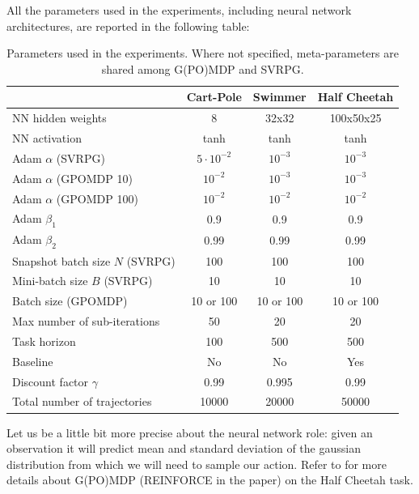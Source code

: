 All the parameters used in the experiments, including neural network architectures, are reported in the following table:

\begin{table}[H]\caption{Parameters used in the experiments. Where not specified, meta-parameters are shared among G(PO)MDP and SVRPG.}\label{table:metaparams}
	\centering
	\begin{tabular}{| l | c  c  c |}
		\hline	
		& Cart-Pole & Swimmer & Half Cheetah \\
		\hline
		NN hidden weights & 8 & 32x32 & 100x50x25 \\
		NN activation & tanh & tanh & tanh \\
		Adam $\alpha$ (SVRPG) & $5\cdotp10^{-2}$ & $10^{-3}$ & $10^{-3}$ \\
		Adam $\alpha$ (GPOMDP 10) & $10^{-2}$ & $10^{-3}$ & $10^{-3}$ \\
		Adam $\alpha$ (GPOMDP 100) & $10^{-2}$ & $10^{-2}$ & $10^{-2}$ \\
		Adam $\beta_1$ & 0.9 & 0.9 & 0.9 \\
		Adam $\beta_2$ & 0.99 & 0.99 & 0.99 \\ 
		Snapshot batch size $N$ (SVRPG) & 100 & 100 & 100 \\
		Mini-batch size $B$ (SVRPG) & 10 & 10 & 10 \\
		Batch size (GPOMDP) & 10 or 100 & 10 or 100 & 10 or 100\\
		Max number of sub-iterations & 50 & 20 & 20 \\
		Task horizon& 100 & 500 & 500 \\
		Baseline& No & No & Yes \\
		Discount factor $\gamma$& 0.99 & 0.995 & 0.99 \\
		Total number of trajectories& 10000 & 20000 & 50000 \\
		\hline  
	\end{tabular}
\end{table}
Let us be a little bit more precise about the neural network role: given an observation it will predict mean and standard deviation of the gaussian distribution from which we will need to sample our action. Refer to \cite{duan2016benchmarking} for more details about G(PO)MDP (REINFORCE in the paper) on the Half Cheetah task.


